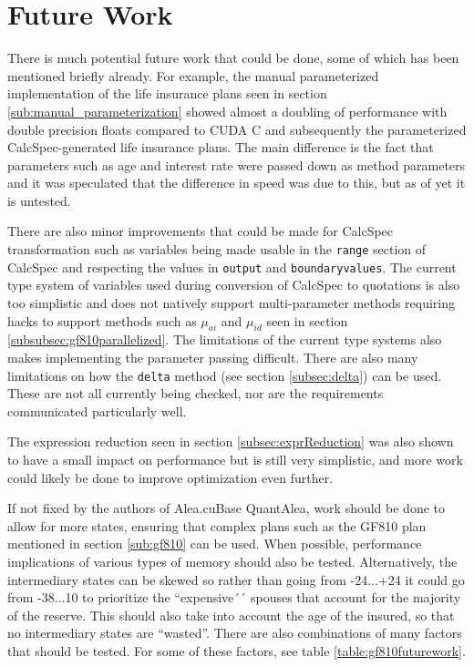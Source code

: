 \section{Future Work}
There is much potential future work that could be done, some of which has been mentioned briefly already.
For example, the manual parameterized implementation of the life insurance plans seen in section \ref{sub:manual_parameterization} showed almost a doubling of performance with double precision floats compared to CUDA C and subsequently the parameterized CalcSpec-generated life insurance plans.
The main difference is the fact that parameters such as age and interest rate were passed down as method parameters and it was speculated that the difference in speed was due to this, but as of yet it is untested.

There are also minor improvements that could be made for CalcSpec transformation such as variables being made usable in the \lstinline$range$ section of CalcSpec and respecting the values in \lstinline$output$ and \lstinline$boundaryvalues$.
The current type system of variables used during conversion of CalcSpec to quotations is also too simplistic and does not natively support multi-parameter methods requiring hacks to support methods such as $\mu_{ai}$ and $\mu_{id}$ seen in section \ref{subsubsec:gf810parallelized}.
The limitations of the current type systems also makes implementing the parameter passing difficult.
There are also many limitations on how the \lstinline$delta$ method (see section \ref{subsec:delta}) can be used.
These are not all currently being checked, nor are the requirements communicated particularly well.

The expression reduction seen in section \ref{subsec:exprReduction} was also shown to have a small impact on performance but is still very simplistic, and more work could likely be done to improve optimization even further.

If not fixed by the authors of Alea.cuBase QuantAlea, work should be done to allow for more states, ensuring that complex plans such as the GF810 plan mentioned in section \ref{sub:gf810} can be used.
When possible, performance implications of various types of memory should also be tested.
Alternatively, the intermediary states can be skewed so rather than going from -24...+24 it could go from -38...10 to prioritize the ``expensive´´ spouses that account for the majority of the reserve.
This should also take into account the age of the insured, so that no intermediary states are ``wasted''.
There are also combinations of many factors that should be tested.
For some of these factors, see table \ref{table:gf810futurework}.

